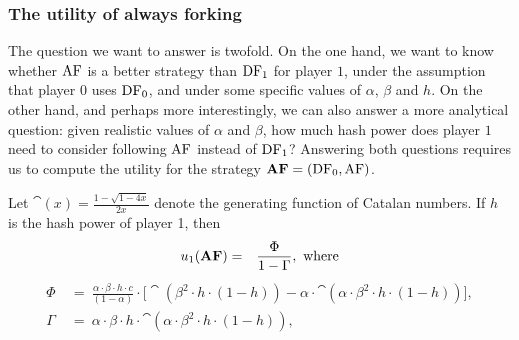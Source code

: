 \subsubsection{The utility of always forking}
The question we want to answer is twofold. On the one hand, we want to know whether $\text{\rm AF}$ is a better strategy than $\text{\rm DF}_1$ for player $1$, under the assumption that player $0$ uses $\text{\rm DF}_0$, and under some specific values of $\alpha$, $\beta$ and $h$. 
On the other hand, and 
perhaps more interestingly, we can also answer a more analytical question: given realistic values of $\alpha$ and $\beta$, how much hash power does player $1$ need to consider following $\text{\rm AF}$ instead of $\text{\rm DF}_1$? 
Answering both questions requires us to compute the utility for the strategy $\text{\rm {\bf AF}}=(\text{\rm DF}_0,\text{\rm AF})$. 

\begin{theorem}\label{thm:always_fork}
Let $\cat(x) = \frac{1-\sqrt{1-4x}}{2x}$ denote the generating function of Catalan numbers.  If $h$ is the hash power of player 1, then
\begin{eqnarray*}
u_1(\text{\rm {\bf AF}}) &=& \frac{\Phi}{1-\Gamma}, \mbox{ where}
\end{eqnarray*}
\begin{align*}
\Phi & \ = \ \frac{\alpha \cdot \beta \cdot h \cdot c}{(1-\alpha)} \cdot \big[\cat(\beta^2 \cdot h \cdot (1-h)) - \alpha\cdot \cat(\alpha \cdot \beta^2 \cdot h \cdot (1-h))\big],\\
\Gamma & \ = \ \alpha \cdot \beta \cdot h \cdot \cat(\alpha\cdot \beta^2 \cdot h \cdot (1-h)),
\end{align*}
\end{theorem}



